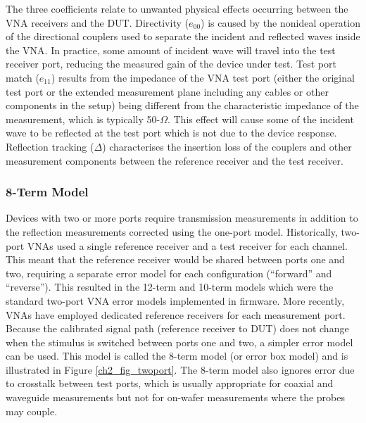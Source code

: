 \documentclass[../thesis/thesis.tex]{subfiles}
\begin{document}
\begin{refsection}
The three coefficients relate to unwanted physical effects occurring between the VNA receivers and the DUT. Directivity ($e_{00}$) is caused by the nonideal operation of the directional couplers used to separate the incident and reflected waves inside the VNA. In practice, some amount of incident wave will travel into the test receiver port, reducing the measured gain of the device under test.
Test port match ($e_{11}$) results from the impedance of the VNA test port (either the original test port or the extended measurement plane including any cables or other components in the setup) being different from the characteristic impedance of the measurement, which is typically 50-$\Omega$. This effect will cause some of the incident wave to be reflected at the test port which is not due to the device response.
Reflection tracking ($\Delta$) characterises the insertion loss of the couplers and other measurement components between the reference receiver and the test receiver.

\subsubsection{8-Term Model}

Devices with two or more ports require transmission measurements in addition to the reflection measurements corrected using the one-port model. Historically, two-port VNAs used a single reference receiver and a test receiver for each channel. This meant that the reference receiver would be shared between ports one and two, requiring a separate error model for each configuration (``forward'' and ``reverse''). This resulted in the 12-term and 10-term models which were the standard two-port VNA error models implemented in firmware. More recently, VNAs have employed dedicated reference receivers for each measurement port. Because the calibrated signal path (reference receiver to DUT) does not change when the stimulus is switched between ports one and two, a simpler error model can be used. This model is called the 8-term model (or error box model) and is illustrated in Figure \ref{ch2_fig_twoport}. The 8-term model also ignores error due to crosstalk between test ports, which is usually appropriate for coaxial and waveguide measurements but not for on-wafer measurements where the probes may couple.


\end{refsection}
\end{document}
